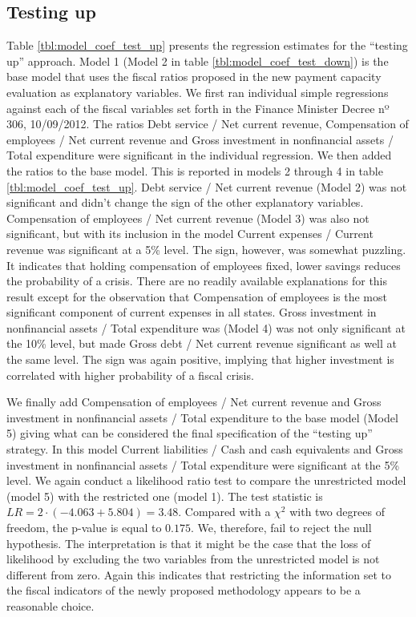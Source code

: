 \clearpage

\subsection*{Testing up}

Table \ref{tbl:model_coef_test_up} presents the regression estimates for the ``testing up'' approach. Model 1 (Model 2 in table \ref{tbl:model_coef_test_down}) is the base model that uses the fiscal ratios proposed in the new payment capacity evaluation as explanatory variables. We first ran individual simple regressions against each of the fiscal variables set forth in the Finance Minister Decree nº 306, 10/09/2012. The ratios Debt service / Net current revenue, Compensation of employees / Net current revenue and Gross investment in nonfinancial assets / Total expenditure were significant in the individual regression. We then added the ratios to the base model. This is reported in models 2 through 4 in table \ref{tbl:model_coef_test_up}. Debt service / Net current revenue (Model 2) was not significant and didn't change the sign of the other explanatory variables. Compensation of employees / Net current revenue (Model 3) was also not significant, but with its inclusion in the model Current expenses / Current revenue was significant at a 5\% level. The sign, however, was somewhat puzzling. It indicates that holding compensation of employees fixed, lower savings reduces the probability of a crisis. There are no readily available explanations for this result except for the observation that Compensation of employees is the most significant component of current expenses in all states. Gross investment in nonfinancial assets / Total expenditure was (Model 4) was not only significant at the 10\% level, but made Gross debt / Net current revenue significant as well at the same level. The sign was again positive, implying that higher investment is correlated with higher probability of a fiscal crisis. 

We finally add Compensation of employees / Net current revenue and Gross investment in nonfinancial assets / Total expenditure to the base model (Model 5) giving what can be considered the final specification of the ``testing up'' strategy. In this model Current liabilities / Cash and cash equivalents and Gross investment in nonfinancial assets / Total expenditure were significant at the 5\% level. We again conduct a likelihood ratio test to compare the unrestricted model (model 5) with the restricted one (model 1). The test statistic is $LR = 2 \cdot (-4.063 + 5.804) = 3.48$. Compared with a $\chi^2$ with two degrees of freedom, the p-value is equal to $0.175$. We, therefore, fail to reject the null hypothesis. The interpretation is that it might be the case that the loss of likelihood by excluding the two variables from the unrestricted model is not different from zero. Again this indicates that restricting the information set to the fiscal indicators of the newly proposed methodology appears to be a reasonable choice.



\clearpage